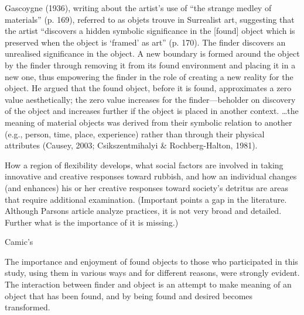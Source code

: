 Gascoygne (1936), writing about the artist’s use of “the strange medley of materials” (p. 169), referred to as objets trouve in Surrealist art, suggesting that the artist “discovers a hidden symbolic significance in the [found] object which is preserved when the object is ‘framed’ as art” (p. 170). The finder discovers an unrealised significance in the object. A new boundary is formed around the object by the finder through removing it from its found environment and placing it in a new one, thus empowering the finder in the role of creating a new reality for the object. He argued that the found object, before it is found, approximates a zero value aesthetically; the zero value increases for the finder---beholder on discovery of the object and increases further if the object is placed in another context. \ldots the meaning of material objects was derived from their symbolic relation to another (e.g., person, time, place, experience) rather than through their physical attributes (Causey, 2003; Csikszentmihalyi \& Rochberg-Halton, 1981). 

How a region of flexibility develops, what social factors are involved in taking innovative and creative responses toward rubbish, and how an individual changes (and enhances) his or her creative responses toward society’s detritus are areas that require additional examination. (Important points a gap in the literature. Although Parsons article analyze practices, it is not very broad and detailed. Further what is the importance of it is missing.)

Camic's  


The importance and enjoyment of found objects to those who participated in this study, using them in various ways and for different reasons, were strongly evident. The interaction between finder and object is an attempt to make meaning of an object that has been found, and by being found and desired becomes transformed.

